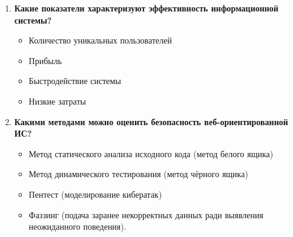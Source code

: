 \documentclass[a4paper, 14pt]{extarticle}
\begin{document}
\begin{enumerate}[label=\textbf{\arabic*.}, itemsep=1.5em, leftmargin=*]
  \item \textbf{Какие показатели характеризуют эффективность
    информационной системы?}

    \begin{itemize}
      \item Количество уникальных пользователей
      \item Прибыль
      \item Быстродействие системы
      \item Низкие затраты
    \end{itemize}

  \item \textbf{Какими методами можно оценить безопасность
    веб-ориентированной ИС?}

    \begin{itemize}
      \item Метод статического анализа исходного кода (метод белого ящика)
      \item Метод динамического тестирования (метод чёрного ящика)
      \item Пентест (моделирование кибератак)
      \item Фаззинг (подача заранее некорректных данных ради
        выявления неожиданного поведения).
    \end{itemize}
\end{enumerate}
\end{document}
